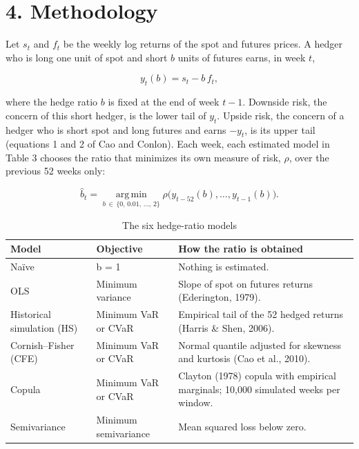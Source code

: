 \documentclass[11pt,letterpaper]{article}
\begin{document}
\section*{4. Methodology}

Let $s_t$ and $f_t$ be the weekly log returns of the spot and futures prices. A hedger who is long one unit of spot and short $b$ units of futures earns, in week $t$,

\begin{equation}
y_t(b) = s_t - b\,f_t ,
\end{equation}

where the hedge ratio $b$ is fixed at the end of week $t-1$. Downside risk, the concern of this short hedger, is the lower tail of $y_t$. Upside risk, the concern of a hedger who is short spot and long futures and earns $-y_t$, is its upper tail (equations 1 and 2 of Cao and Conlon). Each week, each estimated model in Table 3 chooses the ratio that minimizes its own measure of risk, $\rho$, over the previous 52 weeks only:

\begin{equation}
\hat b_t = \operatorname*{arg\,min}_{b\,\in\,\{0,\,0.01,\,\ldots,\,2\}} \rho\big(y_{t-52}(b),\ldots,y_{t-1}(b)\big).
\end{equation}

\begin{table}[!htb]
\caption{The six hedge-ratio models}
\centering
\fontsize{9}{11.2}\selectfont\setlength{\tabcolsep}{3pt}
\begin{tabular}{@{}>{\raggedright\arraybackslash}p{}>{\centering\arraybackslash}p{}>{\centering\arraybackslash}p{}@{}}
\toprule
\textbf{Model} & \textbf{Objective} & \textbf{How the ratio is obtained} \\
\midrule
Naïve & b = 1 & Nothing is estimated. \\
OLS & Minimum variance & Slope of spot on futures returns (Ederington, 1979). \\
Historical simulation (HS) & Minimum VaR or CVaR & Empirical tail of the 52 hedged returns (Harris \& Shen, 2006). \\
Cornish–Fisher (CFE) & Minimum VaR or CVaR & Normal quantile adjusted for skewness and kurtosis (Cao et al., 2010). \\
Copula & Minimum VaR or CVaR & Clayton (1978) copula with empirical marginals; 10,000 simulated weeks per window. \\
Semivariance & Minimum semivariance & Mean squared loss below zero. \\
\bottomrule
\end{tabular}
\end{table}
\end{document}

